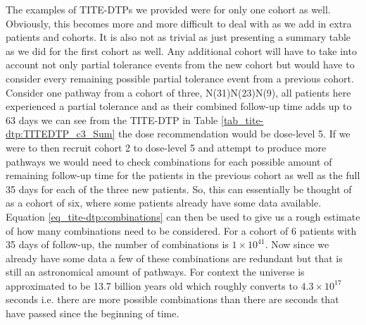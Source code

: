 The examples of TITE-DTPs we provided were for only one cohort as well. Obviously, this becomes more and more difficult to deal with as we add in extra patients and cohorts. It is also not as trivial as just presenting a summary table as we did for the first cohort as well. Any additional cohort will have to take into account not only partial tolerance events from the new cohort but would have to consider every remaining possible partial tolerance event from a previous cohort. Consider one pathway from a cohort of three, N(31)N(23)N(9), all patients here experienced a partial tolerance and as their combined follow-up time adds up to 63 days we can see from the TITE-DTP in Table \ref{tab_tite-dtp:TITEDTP_c3_Sum} the dose recommendation would be dose-level 5. If we were to then recruit cohort 2 to dose-level 5 and attempt to produce more pathways we would need to check combinations for each possible amount of remaining follow-up time for the patients in the previous cohort as well as the full 35 days for each of the three new patients. So, this can essentially be thought of as a cohort of six, where some patients already have some data available. Equation \ref{eq_tite-dtp:combinations} can then be used to give us a rough estimate of how many combinations need to be considered. For a cohort of 6 patients with 35 days of follow-up, the number of combinations is $1 \times 10^{41}$. Now since we already have some data a few of these combinations are redundant but that is still an astronomical amount of pathways. For context the universe is approximated to be 13.7 billion years old \cite{DictionaryPhysics2009} which roughly converts to $4.3 \times 10^{17}$ seconds i.e. there are more possible combinations than there are seconds that have passed since the beginning of time. 

